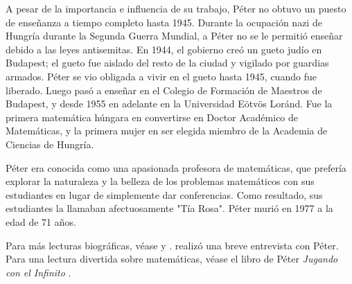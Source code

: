 \documentclass[../../../include/open-logic-section]{subfiles}
\begin{document}
A pesar de la importancia e influencia de su trabajo, P\'eter no obtuvo un puesto de enseñanza a tiempo completo hasta 1945. Durante la ocupación nazi de Hungría durante la Segunda Guerra Mundial, a P\'eter no se le permitió enseñar debido a las leyes antisemitas. En 1944, el gobierno creó un gueto judío en Budapest; el gueto fue aislado del resto de la ciudad y vigilado por guardias armados. P\'eter se vio obligada a vivir en el gueto hasta 1945, cuando fue liberado. Luego pasó a enseñar en el Colegio de Formación de Maestros de Budapest, y desde 1955 en adelante en la Universidad E\"otv\"os Lor\'and. Fue la primera matemática húngara en convertirse en Doctor Académico de Matemáticas, y la primera mujer en ser elegida miembro de la Academia de Ciencias de Hungría.

P\'{e}ter era conocida como una apasionada profesora de matemáticas, que prefería explorar la naturaleza y la belleza de los problemas matemáticos con sus estudiantes en lugar de simplemente dar conferencias. Como resultado, sus estudiantes la llamaban afectuosamente "Tía Rosa". P\'eter murió en 1977 a la edad de 71 años.

\begin{reading}
Para más lecturas biográficas, véase \citep{Oconnor2014} y \citep{Andrasfai1986}. \citet{Tamassy1994} realizó una breve entrevista con P\'eter. Para una lectura divertida sobre matemáticas, véase el libro de P\'eter \emph{Jugando con el Infinito} \citep{Peter2010}.
\end{reading}
\end{document}
